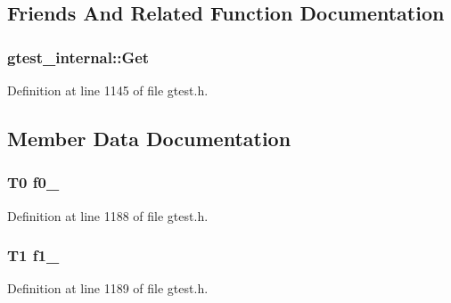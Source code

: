 \subsection{\-Friends \-And \-Related \-Function \-Documentation}
\hypertarget{classstd_1_1tr1_1_1tuple_a8baf0c85256b4370382c7129e48e9875}{
\subsubsection[{gtest\-\_\-internal\-::\-Get}]{\setlength{\rightskip}{0pt plus 5cm}gtest\-\_\-internal\-::\-Get}}\label{d7/d6d/classstd_1_1tr1_1_1tuple_a8baf0c85256b4370382c7129e48e9875}


\-Definition at line 1145 of file gtest.\-h.



\subsection{\-Member \-Data \-Documentation}
\hypertarget{classstd_1_1tr1_1_1tuple_a47c8da1ffce21e1ef1ed7ab0a52d5e59}{
\subsubsection[{f0\-\_\-}]{\setlength{\rightskip}{0pt plus 5cm}\-T0 {\bf f0\-\_\-}}}\label{d7/d6d/classstd_1_1tr1_1_1tuple_a47c8da1ffce21e1ef1ed7ab0a52d5e59}


\-Definition at line 1188 of file gtest.\-h.

\hypertarget{classstd_1_1tr1_1_1tuple_a231ac57e5dc4335e379df57e0824b7dd}{
\subsubsection[{f1\-\_\-}]{\setlength{\rightskip}{0pt plus 5cm}\-T1 {\bf f1\-\_\-}}}\label{d7/d6d/classstd_1_1tr1_1_1tuple_a231ac57e5dc4335e379df57e0824b7dd}


\-Definition at line 1189 of file gtest.\-h.

